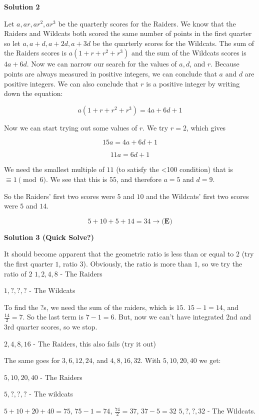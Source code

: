 \begin{enumerate}
 



\textbf{Solution 2}

Let $a,ar,ar^{2},ar^{3}$ be the quarterly scores for the Raiders. We know that the Raiders and Wildcats both scored the same number of points in the first quarter so let $a,a+d,a+2d,a+3d$ be the quarterly scores for the Wildcats. The sum of the Raiders scores is $a(1+r+r^{2}+r^{3})$ and the sum of the Wildcats scores is $4a+6d$. Now we can narrow our search for the values of $a,d$, and $r$. Because points are always measured in positive integers, we can conclude that $a$ and $d$ are positive integers. We can also conclude that $r$ is a positive integer by writing down the equation:

 
 \[a(1+r+r^{2}+r^{3})=4a+6d+1\]

 Now we can start trying out some values of $r$. We try $r=2$, which gives

 
 \[15a=4a+6d+1\]

 \[11a=6d+1\]

 We need the smallest multiple of $11$ (to satisfy the <100 condition) that is $\equiv 1 \pmod{6}$. We see that this is $55$, and therefore $a=5$ and $d=9$.

 So the Raiders' first two scores were $5$ and $10$ and the Wildcats' first two scores were $5$ and $14$. 

 
 \[5+10+5+14=34 \longrightarrow \boxed{\textbf{(E)}}\]




\textbf{Solution 3 (Quick Solve?)}

It should become apparent that the geometric ratio is less than or equal to $2$ (try the first quarter $1$, ratio $3$). Obviously, the ratio is more than $1$, so we try the ratio of $2$
$1, 2, 4, 8$ - The Raiders 

 $1, ?, ?, ?$ - The Wildcats

 To find the $?$s, we need the sum of the raiders, which is $15$. $15-1=14$, and $\frac{14}2=7$. So the last term is $7-1=6$. But, now we can't have integrated 2nd and 3rd quarter scores, so we stop.

 $2, 4, 8, 16$ - The Raiders, this also fails (try it out)

 The same goes for $3, 6, 12, 24$, and $4, 8, 16, 32$. With $5, 10, 20, 40$ we get:

 $5, 10, 20, 40$ - The Raiders

 $5, ?, ?, ?$ - The wildcats

 $5+10+20+40=75$, $75-1=74$, $\frac{74}2=37$, $37-5=32$
$5, ?, ?, 32$ - The Wildcats.


\end{enumerate}
